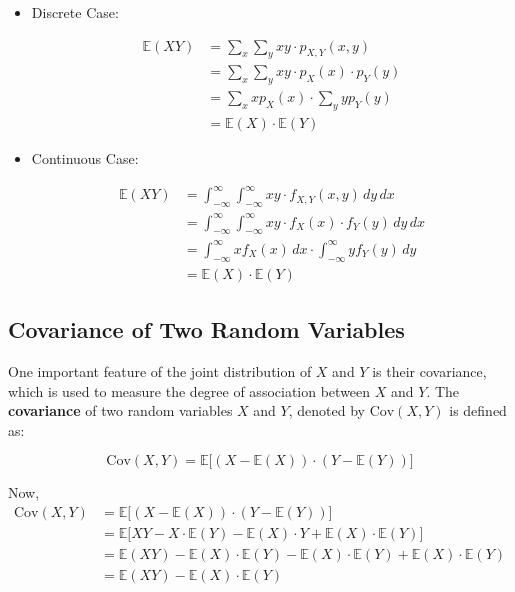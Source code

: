 \documentclass[twoside]{book}
\begin{document}
\begin{itemize}

\item{Discrete Case}:

\begin{align*}
    \mathbb{E}(XY) &= \sum_{x} \sum_{y} xy \cdot p_{X,Y}(x, y)\\
    &=\sum_{x} \sum_{y} xy \cdot p_{X}(x)\cdot p_{Y}(y)\\
    &= \sum_{x} x p_X(x) \cdot  \sum_{y} y p_Y(y) \\
    &= \mathbb{E}(X) \cdot \mathbb{E}(Y)
\end{align*}

\item{Continuous Case}:

\begin{align*}
    \mathbb{E}(XY) &= \int_{-\infty}^{\infty} \int_{-\infty}^{\infty} xy \cdot f_{X,Y}(x, y) \, dy \, dx\\
    &= \int_{-\infty}^{\infty} \int_{-\infty}^{\infty} xy \cdot f_X(x)\cdot f_Y(y) \, dy \, dx\\
    &= \int_{-\infty}^{\infty} x f_X(x) \, dx\cdot  \int_{-\infty}^{\infty} y f_Y(y) \, dy \\
    &= \mathbb{E}(X) \cdot \mathbb{E}(Y)
\end{align*}

\end{itemize}
\vspace{1em}


\subsection{Covariance of Two Random Variables}

One important feature of the joint distribution of $X$ and $Y$ is their covariance, which is used to measure the degree of association between $X$ and $Y$. The \textbf{covariance} of two random variables \( X \) and \( Y \), denoted by \( \mathrm{Cov}(X, Y) \) is defined as:
\begin{textbox}
    \[
\mathrm{Cov}(X, Y) = \mathbb{E}\big[(X - \mathbb{E}(X))\cdot (Y - \mathbb{E}(Y))\big]
\]
\end{textbox}

Now,
\begin{align*}
\mathrm{Cov}(X, Y)
&= \mathbb{E}\big[(X - \mathbb{E}(X))\cdot(Y - \mathbb{E}(Y))\big] \\
&= \mathbb{E}\big[XY - X\cdot \mathbb{E}(Y) - \mathbb{E}(X)\cdot Y + \mathbb{E}(X)\cdot \mathbb{E}(Y)\big] \\
&= \mathbb{E}(XY) - \mathbb{E}(X)\cdot \mathbb{E}(Y) - \mathbb{E}(X)\cdot \mathbb{E}(Y) + \mathbb{E}(X)\cdot \mathbb{E}(Y) \\
&= \mathbb{E}(XY) - \mathbb{E}(X)\cdot \mathbb{E}(Y)
\end{align*}
\end{document}
